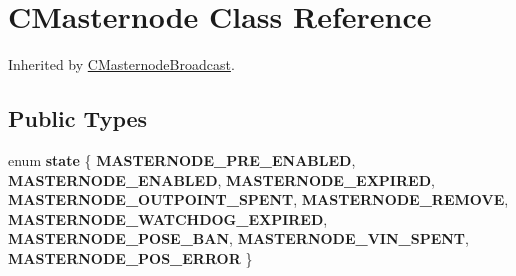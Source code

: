 \hypertarget{class_c_masternode}{}\section{C\+Masternode Class Reference}
\label{class_c_masternode}


Inherited by \mbox{\hyperlink{class_c_masternode_broadcast}{C\+Masternode\+Broadcast}}.

\subsection*{Public Types}
\begin{DoxyCompactItemize}
\item 
\mbox{\label{class_c_masternode_a958e9e8587729e417d1a529c81bf2eb0}} 
enum {\bfseries state} \{ \newline
{\bfseries M\+A\+S\+T\+E\+R\+N\+O\+D\+E\+\_\+\+P\+R\+E\+\_\+\+E\+N\+A\+B\+L\+ED}, 
{\bfseries M\+A\+S\+T\+E\+R\+N\+O\+D\+E\+\_\+\+E\+N\+A\+B\+L\+ED}, 
{\bfseries M\+A\+S\+T\+E\+R\+N\+O\+D\+E\+\_\+\+E\+X\+P\+I\+R\+ED}, 
{\bfseries M\+A\+S\+T\+E\+R\+N\+O\+D\+E\+\_\+\+O\+U\+T\+P\+O\+I\+N\+T\+\_\+\+S\+P\+E\+NT}, 
\newline
{\bfseries M\+A\+S\+T\+E\+R\+N\+O\+D\+E\+\_\+\+R\+E\+M\+O\+VE}, 
{\bfseries M\+A\+S\+T\+E\+R\+N\+O\+D\+E\+\_\+\+W\+A\+T\+C\+H\+D\+O\+G\+\_\+\+E\+X\+P\+I\+R\+ED}, 
{\bfseries M\+A\+S\+T\+E\+R\+N\+O\+D\+E\+\_\+\+P\+O\+S\+E\+\_\+\+B\+AN}, 
{\bfseries M\+A\+S\+T\+E\+R\+N\+O\+D\+E\+\_\+\+V\+I\+N\+\_\+\+S\+P\+E\+NT}, 
\newline
{\bfseries M\+A\+S\+T\+E\+R\+N\+O\+D\+E\+\_\+\+P\+O\+S\+\_\+\+E\+R\+R\+OR}
 \}
\end{DoxyCompactItemize}
